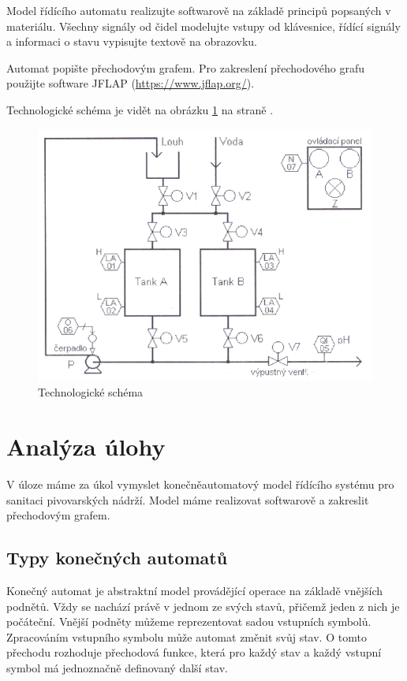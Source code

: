 \documentclass[12pt]{report}
\begin{document}
	Model řídícího automatu realizujte softwarově na základě principů popsaných v materiálu. Všechny signály od čidel modelujte vstupy od klávesnice, řídící signály a informaci o stavu vypisujte textově na obrazovku.
	
	Automat popište přechodovým grafem. Pro zakreslení přechodového grafu použijte software JFLAP (\href{https://www.jflap.org/}{https://www.jflap.org/}).
	
	Technologické schéma je vidět na obrázku \ref{fig:schema} na straně \pageref{fig:schema}.
	
	\begin{figure}
		\centering
		\includegraphics[width=0.6\textheight]{schema}
		\caption{Technologické schéma}
		\label{fig:schema}
	\end{figure}
	
	\chapter{Analýza úlohy}
	V úloze máme za úkol vymyslet konečněautomatový model řídícího systému pro sanitaci pivovarských nádrží. Model máme realizovat softwarově a zakreslit přechodovým grafem.
	
	\section{Typy konečných automatů}
	Konečný automat je abstraktní model provádějící operace na základě vnějších podnětů. Vždy se nachází právě v jednom ze svých stavů, přičemž jeden z nich je počáteční. Vnější podněty můžeme reprezentovat sadou vstupních symbolů. Zpracováním vstupního symbolu může automat změnit svůj stav. O tomto přechodu rozhoduje přechodová funkce, která pro každý stav a každý vstupní symbol má jednoznačně definovaný další stav.
	
\end{document}
